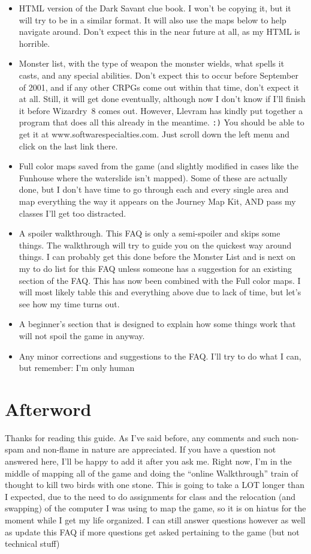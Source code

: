 \documentclass[12pt]{article}
\providecommand{\tightlist}{%
  \setlength{\itemsep}{0pt}\setlength{\parskip}{0pt}}
\begin{document}
\begin{itemize}
\tightlist
\item
  HTML version of the Dark Savant clue book. I won't be copying it, but
  it will try to be in a similar format. It will also use the maps below
  to help navigate around. Don't expect this in the near future at all,
  as my HTML is horrible.
\item
  Monster list, with the type of weapon the monster wields, what spells
  it casts, and any special abilities. Don't expect this to occur before
  September of 2001, and if any other CRPGs come out within that time,
  don't expect it at all. Still, it will get done eventually, although
  now I don't know if I'll finish it before Wizardry~8 comes out.
  However, Llevram has kindly put together a program that does all this
  already in the meantime. \texttt{:)} You should be able to get it at
  www.softwarespecialties.com. Just scroll down the left menu and click
  on the last link there.
\item
  Full color maps saved from the game (and slightly modified in cases
  like the Funhouse where the waterslide isn't mapped). Some of these
  are actually done, but I don't have time to go through each and every
  single area and map everything the way it appears on the Journey Map
  Kit, AND pass my classes I'll get too distracted.
\item
  A spoiler walkthrough. This FAQ is only a semi-spoiler and skips some
  things. The walkthrough will try to guide you on the quickest way
  around things. I can probably get this done before the Monster List
  and is next on my to do list for this FAQ unless someone has a
  suggestion for an existing section of the FAQ. This has now been
  combined with the Full color maps. I will most likely table this and
  everything above due to lack of time, but let's see how my time turns
  out.
\item
  A beginner's section that is designed to explain how some things work
  that will not spoil the game in anyway.
\item
  Any minor corrections and suggestions to the FAQ. I'll try to do what
  I can, but remember: I'm only human
\end{itemize}

\section{Afterword}\label{afterword}

Thanks for reading this guide. As I've said before, any comments and such
non-spam and non-flame in nature are appreciated. If you have a question not
answered here, I'll be happy to add it after you ask me.  Right now, I'm in
the middle of mapping all of the game and doing the ``online Walkthrough''
train of thought to kill two birds with one stone. This is going to take a
LOT longer than I expected, due to the need to do assignments for class and
the relocation (and swapping) of the computer I was using to map the game, so
it is on hiatus for the moment while I get my life organized. I can still
answer questions however as well as update this FAQ if more questions get
asked pertaining to the game (but not technical stuff)

\clearpage
{}
\printindex
\end{document}
